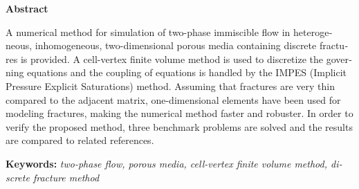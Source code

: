 \thispagestyle{empty} %
\begin{latin} %

\centerline{\textbf{\large{Abstract}}}
\vskip 1cm

\noindent ​A numerical method for simulation of two-phase immiscible flow in heterogeneous, inhomogeneous, two-dimensional porous media containing discrete fractures is provided.  A cell-vertex finite volume method is used to discretize the governing equations and the coupling of equations is handled by the IMPES (Implicit Pressure Explicit Saturations) method. Assuming that fractures are very thin compared to the adjacent matrix, one-dimensional elements have been used for modeling fractures, making the numerical method faster and robuster. In order to verify the proposed method, three benchmark problems are solved and the results are compared to related references.​


\textbf{Keywords:} 
\emph{two-phase flow, porous media, cell-vertex finite volume method, discrete fracture method}

\end{latin}
